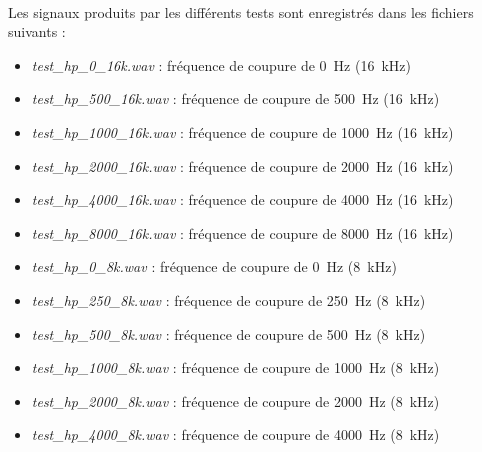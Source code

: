 \documentclass{article}
\begin{document}
    \paragraph{}
    Les signaux produits par les différents tests sont enregistrés dans les fichiers suivants :
    \begin{itemize}
        \item \emph{test\_hp\_0\_16k.wav} : fréquence de coupure de \SI{0}{\hertz} (\SI{16}{\kilo\hertz})
        \item \emph{test\_hp\_500\_16k.wav} : fréquence de coupure de \SI{500}{\hertz} (\SI{16}{\kilo\hertz})
        \item \emph{test\_hp\_1000\_16k.wav} : fréquence de coupure de \SI{1000}{\hertz} (\SI{16}{\kilo\hertz})
        \item \emph{test\_hp\_2000\_16k.wav} : fréquence de coupure de \SI{2000}{\hertz} (\SI{16}{\kilo\hertz})
        \item \emph{test\_hp\_4000\_16k.wav} : fréquence de coupure de \SI{4000}{\hertz} (\SI{16}{\kilo\hertz})
        \item \emph{test\_hp\_8000\_16k.wav} : fréquence de coupure de \SI{8000}{\hertz} (\SI{16}{\kilo\hertz})
        \item \emph{test\_hp\_0\_8k.wav} : fréquence de coupure de \SI{0}{\hertz} (\SI{8}{\kilo\hertz})
        \item \emph{test\_hp\_250\_8k.wav} : fréquence de coupure de \SI{250}{\hertz} (\SI{8}{\kilo\hertz})
        \item \emph{test\_hp\_500\_8k.wav} : fréquence de coupure de \SI{500}{\hertz} (\SI{8}{\kilo\hertz})
        \item \emph{test\_hp\_1000\_8k.wav} : fréquence de coupure de \SI{1000}{\hertz} (\SI{8}{\kilo\hertz})
        \item \emph{test\_hp\_2000\_8k.wav} : fréquence de coupure de \SI{2000}{\hertz} (\SI{8}{\kilo\hertz})
        \item \emph{test\_hp\_4000\_8k.wav} : fréquence de coupure de \SI{4000}{\hertz} (\SI{8}{\kilo\hertz})
    \end{itemize}
\end{document}
